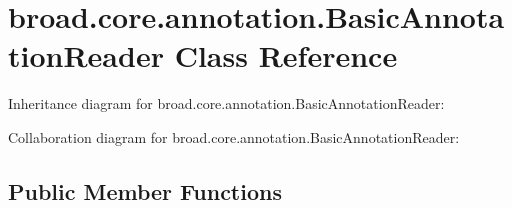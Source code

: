 \hypertarget{classbroad_1_1core_1_1annotation_1_1_basic_annotation_reader}{\section{broad.\+core.\+annotation.\+Basic\+Annotation\+Reader Class Reference}
\label{classbroad_1_1core_1_1annotation_1_1_basic_annotation_reader}
}


Inheritance diagram for broad.\+core.\+annotation.\+Basic\+Annotation\+Reader\+:


Collaboration diagram for broad.\+core.\+annotation.\+Basic\+Annotation\+Reader\+:
\subsection*{Public Member Functions}
